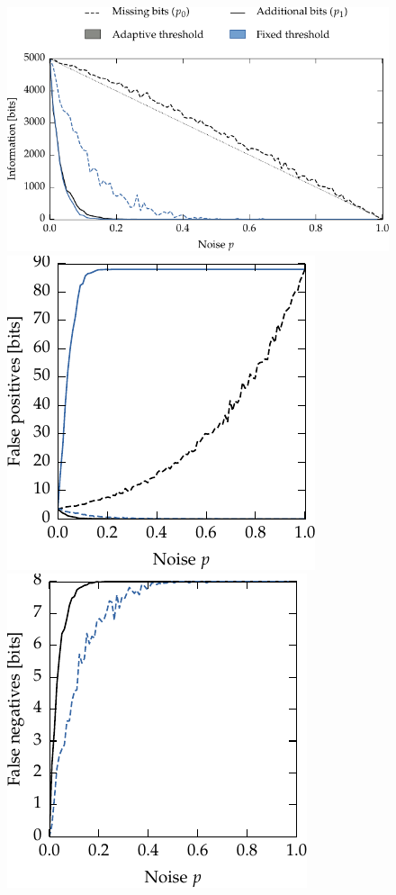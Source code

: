 \begin{figure}[t]
	\centering
	\includegraphics{media/chp2/sketch_info_over_noise.pdf}\\
	\vspace*{0.25cm}
	\includegraphics{media/chp2/sketch_fps_over_noise.pdf}
	\includegraphics{media/chp2/sketch_fns_over_noise.pdf}

\end{figure}

